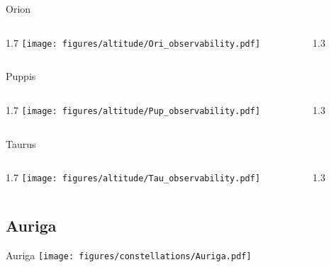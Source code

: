\documentclass[final]{beamer}
\newlength{\colwidth}
\begin{document}
\begin{frame}[t]{}

  \Large{Orion}
  \begin{columns}[T]
    \begin{column}{1.7\colwidth}
      \centering
      \texttt{[image: figures/altitude/Ori\_observability.pdf]}
    \end{column}
    \begin{column}{1.3\colwidth}
      \Large
      
    \end{column}
  \end{columns}

  \Large{Puppis}
  \begin{columns}[T]
    \begin{column}{1.7\colwidth}
      \centering
      \texttt{[image: figures/altitude/Pup\_observability.pdf]}
    \end{column}
    \begin{column}{1.3\colwidth}
      \Large
      
    \end{column}
  \end{columns}

  \Large{Taurus}
  \begin{columns}[T]
    \begin{column}{1.7\colwidth}
      \centering
      \texttt{[image: figures/altitude/Tau\_observability.pdf]}
    \end{column}
    \begin{column}{1.3\colwidth}
      \Large
      
    \end{column}
  \end{columns}
\end{frame}

\subsection{Auriga}

\begin{frame}[t]{\LARGE Auriga}
  \centering
  \texttt{[image: figures/constellations/Auriga.pdf]}
\end{frame}

\end{document}
